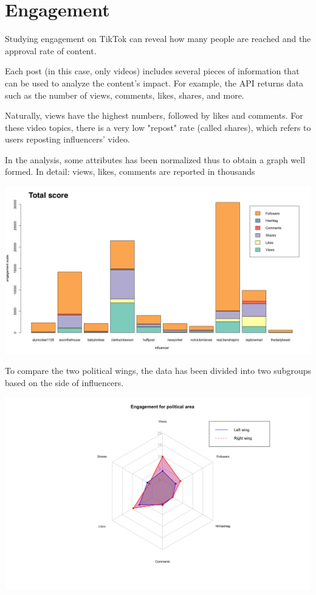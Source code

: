 \section{Engagement}

Studying engagement on TikTok can reveal how many people are reached and the approval rate of content.

Each post (in this case, only videos) includes several pieces of information that can be used to analyze the content's impact. For example, the API returns data such as the number of views, comments, likes, shares, and more.

Naturally, views have the highest numbers, followed by likes and comments. For these video topics, there is a very low "repost" rate (called shares), which refers to users reposting influencers' video.

In the analysis, some attributes has been normalized thus to obtain a graph well formed.
In detail: views, likes, comments are reported in thousands

\includegraphics[width = .48\textwidth]{images/Final_Engagement_TotalScore.png}

To compare the two political wings, the data has been divided into two subgroups based on the side of influencers.

\includegraphics[width = .48\textwidth]{images/Final_Engagement_EngegementPerArea.png}